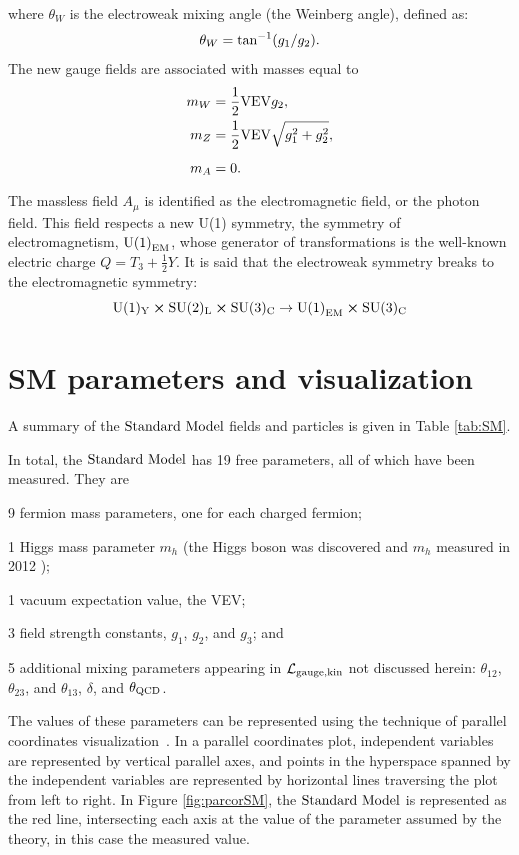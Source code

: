 where $\theta_W$ is the electroweak mixing angle (the Weinberg angle), defined as:
\begin{equation}
\theta_{W}={\rm tan}^{-1}(g_1/g_2).
\end{equation}
The new gauge fields are associated with masses equal to
\begin{align}
\vps m_{W} &= \frac{1}{2}{\rm VEV}g_{2}, \\
\vps m_{Z} &= \frac{1}{2}{\rm VEV}\sqrt{g_{1}^{2}+g_{2}^{2}},\\
\vps m_{A} &= 0.
\end{align}
The massless field $A_{\mu}$ is identified as the electromagnetic field, or the photon field. This field respects a new U(1) symmetry, the symmetry of electromagnetism, ${\rm U(1)}_{\rm EM}$, whose generator of transformations is the well-known electric charge $Q=T_3+\frac{1}{2}Y$. It is said that the electroweak symmetry breaks to the electromagnetic symmetry:
\begin{equation}
\rm U(1)_{Y}\cross\rm SU(2)_{L}\cross\rm SU(3)_{C}\rightarrow{\rm U(1)}_{\rm EM}\cross\rm SU(3)_{C}
\end{equation}

\section{SM parameters and visualization}
\label{sec:parcor}
A summary of the $\text{Standard\ Model}$ fields and particles is given in Table \ref{tab:SM}.  

In total, the $\text{Standard\ Model}$ has 19 free parameters, all of which have been measured. They are
\begin{itemize}
\item{9 fermion mass parameters, one for each charged fermion;}
\item{1 Higgs mass parameter $m_h$ (the Higgs boson was discovered and $m_h$ measured in 2012 \cite{Chatrchyan:2012xdj}); 
\item 1 vacuum expectation value, the VEV;}
\item{3 field strength constants, $g_1$, $g_2$, and $g_3$}; and
\item{5 additional mixing parameters appearing in $\mathcal{L}_{\rm gauge, kin}$ not discussed herein: $\theta_{12}$, $\theta_{23}$, and $\theta_{13}$, $\delta$, and $\theta_{\rm QCD}$.}
\end{itemize}
The values of these parameters can be represented using the technique of parallel coordinates visualization~\cite{bib:parcor}. In a parallel coordinates plot, independent variables are represented by vertical parallel axes, and points in the hyperspace spanned by the independent variables are represented by horizontal lines traversing the plot from left to right. In Figure \ref{fig:parcorSM}, the $\text{Standard\ Model}$ is represented as the red line, intersecting each axis at the value of the parameter assumed by the theory, in this case the measured value.  

